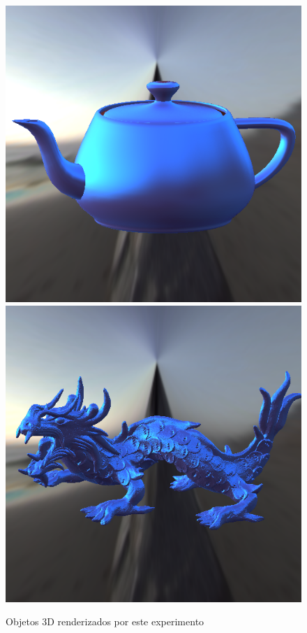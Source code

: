 \begin{figure}[H]
    \caption{\small{Objetos 3D renderizados por este experimento}}\label{fig-cook-torrance-eqlang}
  \includegraphics[width=\linewidth]{./Imagens/brdfs/cook-torrance-teapot.png}
\endminipage\hfill
{}
  \includegraphics[width=\linewidth]{./Imagens/brdfs/cook-torrance-dragon.png}

\end{figure}
